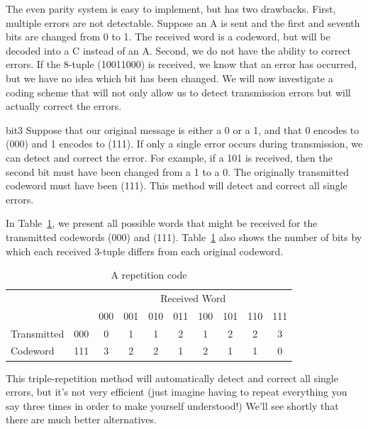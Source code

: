The even parity system is easy to implement, but has two drawbacks.
First, multiple errors are not detectable. Suppose an A is sent and 
the first and seventh bits are changed from 0 to 1. The received word
is a codeword, but will be decoded into a C instead of an A.
Second, we do not have the ability to correct errors.  If the 8-tuple
(10011000) is received, we know that an error has occurred, but we
have no idea which bit has been changed. We will now investigate a
coding scheme that will not only allow us to detect transmission
errors but will actually correct the errors. 

\begin{example}{bit3}
Suppose that our original message is either a 0 or a 1, and that 0
encodes to (000) and 1 encodes to (111). If only a single
error occurs during transmission, we can detect and correct the
error. For example, if a 101 is received, then the second bit must
have been changed from a 1 to a 0.  The originally transmitted
codeword must have been (111). 	This method will detect and correct 
all single errors. 
 
 
In Table~\ref{algcodes:table0}, we present all possible words that might be received
for the transmitted codewords (000) and (111). Table~\ref{algcodes:table0} also shows 
the number of bits by which each received 3-tuple differs from each
original codeword. 

 
\begin{table}[htb]
\caption{A repetition code\label{algcodes:table0}}{\small
\begin{center}
\begin{tabular}{|lc|cccccccc|}
\hline
& & \multicolumn{8}{|c|}{Received Word}    \\
            &     & 000 & 001 & 010 & 011 & 100 & 101 & 110
& 111 \\ \hline
Transmitted & 000 & 0   & 1   & 1   & 2   & 1   & 2   & 2
& 3 \\
Codeword   & 111 & 3   &  2  & 2   &  1  &  2  &   1 &  1
&  0 \\ \hline
\end{tabular}
\end{center}
}
\end{table}

This triple-repetition method will automatically detect and correct
all single errors, but it's not very efficient (just imagine having to repeat everything you say three times in order to make yourself understood!)  We'll see shortly that there are much better alternatives.
\end{example}

